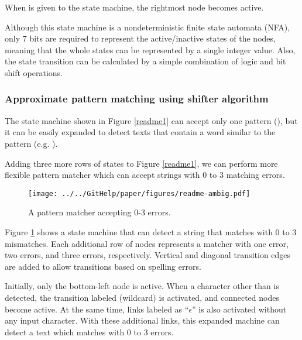 \documentclass[manuscript,anonymous,review]{acmart}
\begin{document}
When  is given to the state machine,
the rightmost node becomes active.
%

Although this state machine is a nondeterministic finite state automata (NFA),
only 7 bits are required to represent the active/inactive states of the nodes,
meaning that the whole states can be represented by a single integer value.
Also,
the state transition can be calculated by a simple combination of
logic and bit shift operations.

\subsubsection{Approximate pattern matching using shifter algorithm}

The state machine shown in Figure \ref{readme1} can accept only one pattern
(), but
it can be easily expanded to detect texts that contain a word
similar to the pattern (e.g. ).


Adding three more rows of states to Figure \ref{readme1}, we can perform more
flexible pattern matcher which can accept strings with
0 to 3 matching errors.

\begin{figure}[htb]
  \centerline{\texttt{[image: ../../GitHelp/paper/figures/readme-ambig.pdf]}}
  \caption{A pattern matcher accepting 0-3 errors.}
  \label{shifterambig}
\end{figure}

Figure \ref{shifterambig} shows a state machine that can detect a string
that matches  with 0 to 3 mismatches.
Each additional row of nodes represents a matcher with one error,
two errors, and three errors, respectively.
Vertical and diagonal transition edges are added to allow
transitions based on spelling errors.

Initially, only the bottom-left node is active.
When a character other than  is detected, 
the transition labeled \sqsf{*} (wildcard) is activated,
and connected nodes become active.
At the same time, links labeled as ``$\epsilon$''
is also activated without any input character.
With these additional links, this expanded machine can detect a text which
matches  with 0 to 3 errors.
\end{document}

